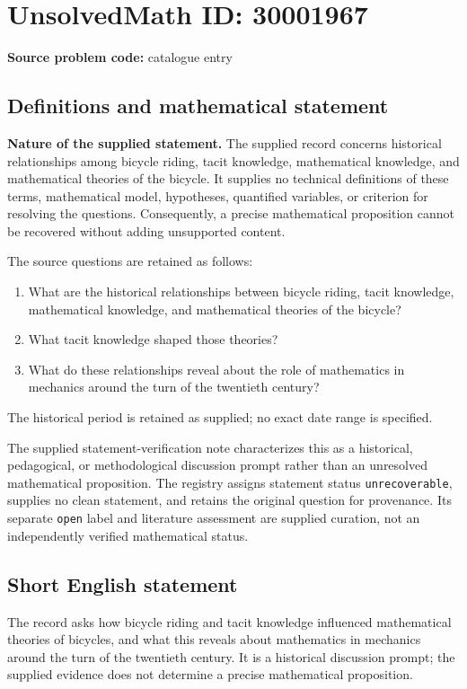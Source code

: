 \documentclass[11pt]{article}
\begin{document}
\section*{UnsolvedMath ID: 30001967}
\textbf{Source problem code:} catalogue entry
\subsection{Definitions and mathematical statement}
\textbf{Nature of the supplied statement.} The supplied record concerns historical relationships among bicycle riding, tacit knowledge, mathematical knowledge, and mathematical theories of the bicycle. It supplies no technical definitions of these terms, mathematical model, hypotheses, quantified variables, or criterion for resolving the questions. Consequently, a precise mathematical proposition cannot be recovered without adding unsupported content.

The source questions are retained as follows:
\begin{enumerate}
\item What are the historical relationships between bicycle riding, tacit knowledge, mathematical knowledge, and mathematical theories of the bicycle?
\item What tacit knowledge shaped those theories?
\item What do these relationships reveal about the role of mathematics in mechanics around the turn of the twentieth century?
\end{enumerate}
The historical period is retained as supplied; no exact date range is specified.

The supplied statement-verification note characterizes this as a historical, pedagogical, or methodological discussion prompt rather than an unresolved mathematical proposition. The registry assigns statement status \texttt{unrecoverable}, supplies no clean statement, and retains the original question for provenance. Its separate \texttt{open} label and literature assessment are supplied curation, not an independently verified mathematical status.
\subsection{Short English statement}
The record asks how bicycle riding and tacit knowledge influenced mathematical theories of bicycles, and what this reveals about mathematics in mechanics around the turn of the twentieth century. It is a historical discussion prompt; the supplied evidence does not determine a precise mathematical proposition.
\end{document}
